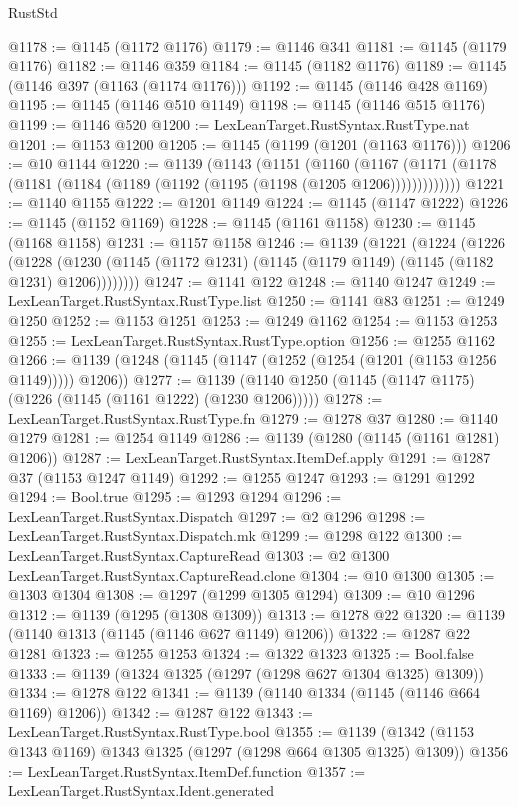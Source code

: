 \begin{lexlean}{RustStd}
\begin{coremodule}
@1178 := @1145 (@1172 @1176)
@1179 := @1146 @341
@1181 := @1145 (@1179 @1176)
@1182 := @1146 @359
@1184 := @1145 (@1182 @1176)
@1189 := @1145 (@1146 @397 (@1163 (@1174 @1176)))
@1192 := @1145 (@1146 @428 @1169)
@1195 := @1145 (@1146 @510 @1149)
@1198 := @1145 (@1146 @515 @1176)
@1199 := @1146 @520
@1200 := LexLeanTarget.RustSyntax.RustType.nat
@1201 := @1153 @1200
@1205 := @1145 (@1199 (@1201 (@1163 @1176)))
@1206 := @10 @1144
@1220 := @1139
    (@1143
      (@1151
        (@1160
          (@1167 (@1171 (@1178 (@1181 (@1184 (@1189 (@1192 (@1195 (@1198 (@1205 @1206)))))))))))))
@1221 := @1140 @1155
@1222 := @1201 @1149
@1224 := @1145 (@1147 @1222)
@1226 := @1145 (@1152 @1169)
@1228 := @1145 (@1161 @1158)
@1230 := @1145 (@1168 @1158)
@1231 := @1157 @1158
@1246 := @1139
    (@1221
      (@1224
        (@1226
          (@1228 (@1230 (@1145 (@1172 @1231) (@1145 (@1179 @1149) (@1145 (@1182 @1231) @1206))))))))
@1247 := @1141 @122
@1248 := @1140 @1247
@1249 := LexLeanTarget.RustSyntax.RustType.list
@1250 := @1141 @83
@1251 := @1249 @1250
@1252 := @1153 @1251
@1253 := @1249 @1162
@1254 := @1153 @1253
@1255 := LexLeanTarget.RustSyntax.RustType.option
@1256 := @1255 @1162
@1266 := @1139 (@1248 (@1145 (@1147 (@1252 (@1254 (@1201 (@1153 @1256 @1149))))) @1206))
@1277 := @1139 (@1140 @1250 (@1145 (@1147 @1175) (@1226 (@1145 (@1161 @1222) (@1230 @1206)))))
@1278 := LexLeanTarget.RustSyntax.RustType.fn
@1279 := @1278 @37
@1280 := @1140 @1279
@1281 := @1254 @1149
@1286 := @1139 (@1280 (@1145 (@1161 @1281) @1206))
@1287 := LexLeanTarget.RustSyntax.ItemDef.apply
@1291 := @1287 @37 (@1153 @1247 @1149)
@1292 := @1255 @1247
@1293 := @1291 @1292
@1294 := Bool.true
@1295 := @1293 @1294
@1296 := LexLeanTarget.RustSyntax.Dispatch
@1297 := @2 @1296
@1298 := LexLeanTarget.RustSyntax.Dispatch.mk
@1299 := @1298 @122
@1300 := LexLeanTarget.RustSyntax.CaptureRead
@1303 := @2 @1300 LexLeanTarget.RustSyntax.CaptureRead.clone
@1304 := @10 @1300
@1305 := @1303 @1304
@1308 := @1297 (@1299 @1305 @1294)
@1309 := @10 @1296
@1312 := @1139 (@1295 (@1308 @1309))
@1313 := @1278 @22
@1320 := @1139 (@1140 @1313 (@1145 (@1146 @627 @1149) @1206))
@1322 := @1287 @22 @1281
@1323 := @1255 @1253
@1324 := @1322 @1323
@1325 := Bool.false
@1333 := @1139 (@1324 @1325 (@1297 (@1298 @627 @1304 @1325) @1309))
@1334 := @1278 @122
@1341 := @1139 (@1140 @1334 (@1145 (@1146 @664 @1169) @1206))
@1342 := @1287 @122
@1343 := LexLeanTarget.RustSyntax.RustType.bool
@1355 := @1139 (@1342 (@1153 @1343 @1169) @1343 @1325 (@1297 (@1298 @664 @1305 @1325) @1309))
@1356 := LexLeanTarget.RustSyntax.ItemDef.function
@1357 := LexLeanTarget.RustSyntax.Ident.generated

\end{coremodule}
\end{lexlean}
